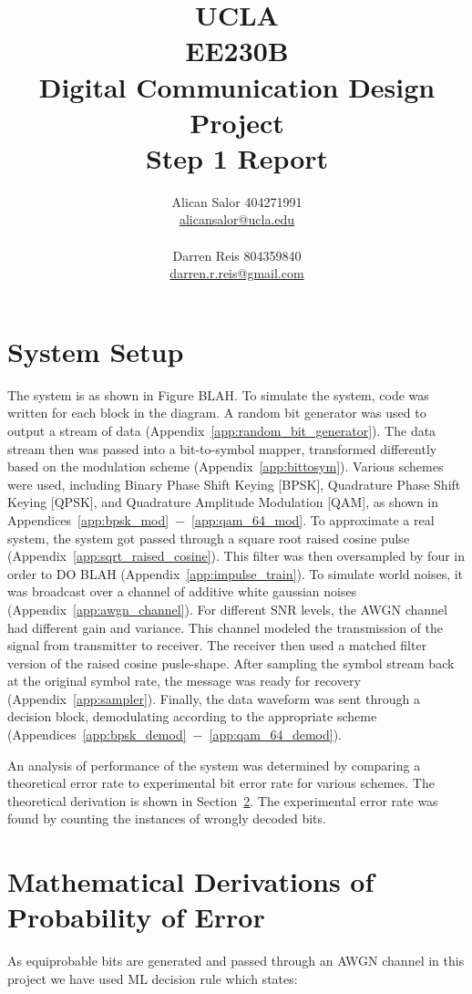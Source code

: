 \documentclass[]{article}
\title{UCLA\\EE230B\\Digital Communication Design Project\\Step 1 Report}
\author{Alican Salor 404271991 \\  \href{mailto:alicansalor@ucla.edu}{alicansalor@ucla.edu} \\ \\
Darren Reis 804359840 \\
\href{mailto:darrer.r.reis@gmail.com}{darren.r.reis@gmail.com} }
\begin{document}
\maketitle

\newpage
\tableofcontents

\newpage


\section{System Setup}
\label{sec:setup}
The system is as shown in Figure BLAH.  To simulate the system, code was written for each block in the diagram.  A random bit generator was used to output a stream of data (Appendix~\ref{app:random_bit_generator}).  The data stream then was passed into a bit-to-symbol mapper, transformed differently based on the modulation scheme (Appendix~\ref{app:bittosym}).  Various schemes were used, including Binary Phase Shift Keying [BPSK], Quadrature Phase Shift Keying [QPSK], and Quadrature Amplitude Modulation [QAM], as shown in Appendices~\ref{app:bpsk_mod}~$-$~\ref{app:qam_64_mod}. To approximate a real system, the system got passed through a square root raised cosine pulse (Appendix~\ref{app:sqrt_raised_cosine}).  This filter was then oversampled by four in order to DO BLAH (Appendix~\ref{app:impulse_train}).  To simulate world noises, it was broadcast over a channel of additive white gaussian noises (Appendix~\ref{app:awgn_channel}).  For different SNR levels, the AWGN channel had different gain and variance.  This channel modeled the transmission of the signal from transmitter to receiver.  The receiver then used a matched filter version of the raised cosine pusle-shape.  After sampling the symbol stream back at the original symbol rate, the message was ready for recovery (Appendix~\ref{app:sampler}).  Finally, the data waveform was sent through a decision block, demodulating according to the appropriate scheme (Appendices~\ref{app:bpsk_demod}~$-$~\ref{app:qam_64_demod}).  

An analysis of performance of the system was determined by comparing a theoretical error rate to experimental bit error rate for various schemes.  The theoretical derivation is shown in Section~\ref{sec:deriv}.  The experimental error rate was found by counting the instances of wrongly decoded bits.  

\newpage
\section{Mathematical Derivations of Probability of Error}
\label{sec:deriv}
As equiprobable bits are generated and passed through an AWGN channel in this project we have used ML decision rule which states: \\
\end{document}
